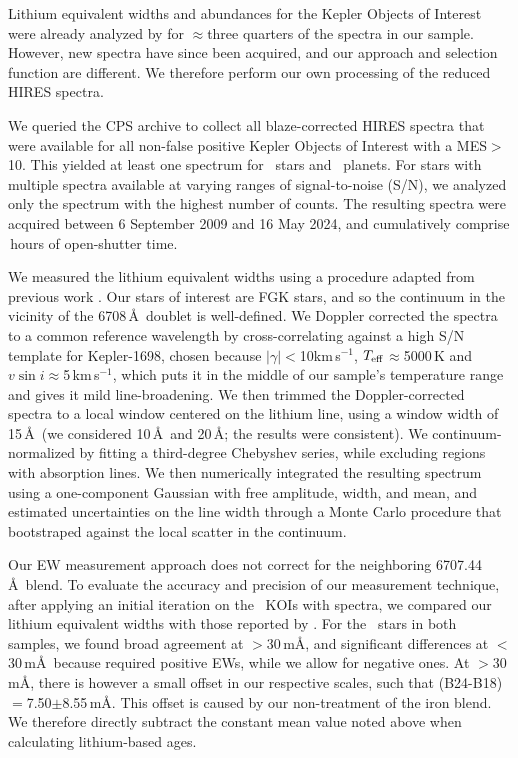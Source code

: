 \documentclass[11pt,twocolumn,tighten]{aastex63}
\newcommand{\kms}{{km\,s$^{-1}$}}
\begin{document}
Lithium equivalent widths and abundances for the Kepler Objects of
Interest were already analyzed by \citet{2018ApJ...855..115B} for
$\approx$three quarters of the spectra in our sample.  However, new
spectra have since been acquired, and our approach and selection function are different.
We therefore perform our own processing of the reduced HIRES spectra.

We queried the CPS archive to collect all blaze-corrected
HIRES spectra that were available for all non-false positive Kepler
Objects of Interest with a MES$>$10.  This yielded at least one
spectrum for \nlithiumstars\ stars and \nlithiumplanets\ planets.  For
stars with multiple spectra available at varying ranges of
signal-to-noise (S/N), we analyzed only the spectrum with the highest
number of counts.  The resulting spectra were acquired between 6
September 2009 and 16 May 2024, and cumulatively comprise
\nhireshours\,hours of open-shutter time.

We measured the lithium equivalent widths using a procedure
adapted from previous work \citep{Bouma_2021}.  Our stars of interest
are FGK stars, and so the continuum in the vicinity of the 
6708\,\AA\ doublet is well-defined.  We Doppler corrected the spectra
to a common reference wavelength by cross-correlating against a high
S/N template for Kepler-1698, chosen because $|\gamma|$$<$10\kms,
$T_{\rm eff}$$\approx$5000\,K and $v\sin i$$\approx$5\,\kms, which
puts it in the middle of our sample's temperature range and gives it
mild line-broadening.  We then trimmed the Doppler-corrected spectra
to a local window centered on the lithium line, using a window width
of 15\,\AA\ (we considered 10\,\AA\ and 20\,\AA; the results were
consistent).  We continuum-normalized by fitting a
third-degree Chebyshev series, while excluding regions with
absorption lines.  We then numerically integrated the resulting
spectrum using a one-component Gaussian with free amplitude, width,
and mean, and estimated uncertainties on the line width through a
Monte Carlo procedure that bootstraped against the local scatter in
the continuum.

Our EW measurement approach does not correct for the neighboring
 6707.44\,\AA\ blend.  To evaluate the accuracy and
precision of our measurement technique, after applying an
initial iteration on the \nlithiumstars\ KOIs with spectra, we
compared our lithium equivalent widths with those reported by
\citet{2018ApJ...855..115B}.  For the \nbergeroverlap\ stars in both
samples, we found broad agreement at $>$30\,m\AA, and significant
differences at $<$30\,m\AA\ because \citet{2018ApJ...855..115B}
required positive EWs, while we allow for negative ones.  At
$>$30\,m\AA, there is however a small offset in our respective
scales, such that (B24-B18)$=$7.50$\pm$8.55\,m\AA.  This offset is
caused by our non-treatment of the iron blend.  We therefore directly
subtract the constant mean value noted above when calculating
lithium-based ages.
\end{document}
